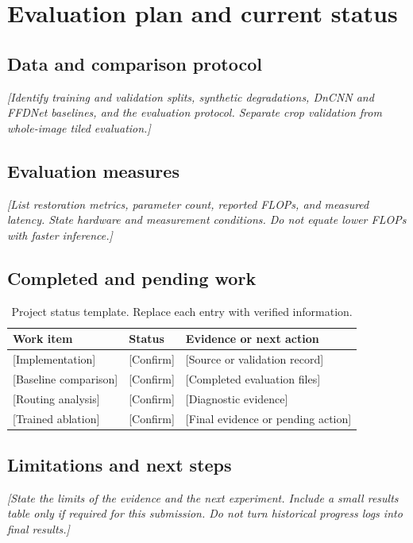 \chapter{Evaluation plan and current status}
\label{ch:evaluation}

\section{Data and comparison protocol}
\textit{[Identify training and validation splits, synthetic degradations, DnCNN and FFDNet baselines, and the evaluation protocol. Separate crop validation from whole-image tiled evaluation.]}

\section{Evaluation measures}
\textit{[List restoration metrics, parameter count, reported FLOPs, and measured latency. State hardware and measurement conditions. Do not equate lower FLOPs with faster inference.]}

\section{Completed and pending work}
\begin{singlespace}
\begin{table}[ht]
\centering
\caption{Project status template. Replace each entry with verified information.}
\begin{tabular}{p{}p{}p{}}
\toprule
Work item & Status & Evidence or next action \\
\midrule
{[Implementation]} & [Confirm] & [Source or validation record] \\
{[Baseline comparison]} & [Confirm] & [Completed evaluation files] \\
{[Routing analysis]} & [Confirm] & [Diagnostic evidence] \\
{[Trained ablation]} & [Confirm] & [Final evidence or pending action] \\
\bottomrule
\end{tabular}
\end{table}
\end{singlespace}

\section{Limitations and next steps}
\textit{[State the limits of the evidence and the next experiment. Include a small results table only if required for this submission. Do not turn historical progress logs into final results.]}
